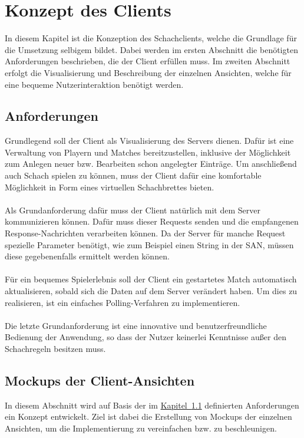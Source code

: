 
\chapter{Konzept des Clients}\label{sec:conceptClient}
In diesem Kapitel ist die Konzeption des Schachclients, welche die Grundlage für die Umsetzung selbigem bildet. Dabei werden im ersten Abschnitt die benötigten Anforderungen beschrieben, die der Client erfüllen muss. Im zweiten Abschnitt erfolgt die Visualisierung und Beschreibung der einzelnen Ansichten, welche für eine bequeme Nutzerinteraktion benötigt werden.

\section{Anforderungen}\label{sec:anforderungenClient}
Grundlegend soll der Client als Visualisierung des Servers dienen. Dafür ist eine Verwaltung von Playern und Matches bereitzustellen, inklusive der Möglichkeit zum Anlegen neuer bzw. Bearbeiten schon angelegter Einträge. Um anschließend auch Schach spielen zu können, muss der Client dafür eine komfortable Möglichkeit in Form eines virtuellen Schachbrettes bieten.\\
\\
Als Grundanforderung dafür muss der Client natürlich mit dem Server kommunizieren können. Dafür muss dieser Requests senden und die empfangenen Response-Nachrichten verarbeiten können. Da der Server für manche Request spezielle Parameter benötigt, wie zum Beispiel einen String in der \gls{SAN}, müssen diese gegebenenfalls ermittelt werden können.\\
\\
Für ein bequemes Spielerlebnis soll der Client ein gestartetes Match automatisch aktualisieren, sobald sich die Daten auf dem Server verändert haben. Um dies zu realisieren, ist ein einfaches Polling-Verfahren zu implementieren.\\
\\ 
Die letzte Grundanforderung ist eine innovative und benutzerfreundliche Bedienung der Anwendung, so dass der Nutzer keinerlei Kenntnisse außer den Schachregeln besitzen muss.

\section{Mockups der Client-Ansichten}\label{sec:views}
In diesem Abschnitt wird auf Basis der im \hyperref[sec:anforderungenClient]{Kapitel~\ref{sec:anforderungenClient}} definierten Anforderungen ein Konzept entwickelt. Ziel ist dabei die Erstellung von Mockups der einzelnen Ansichten, um die Implementierung zu vereinfachen bzw. zu beschleunigen.

